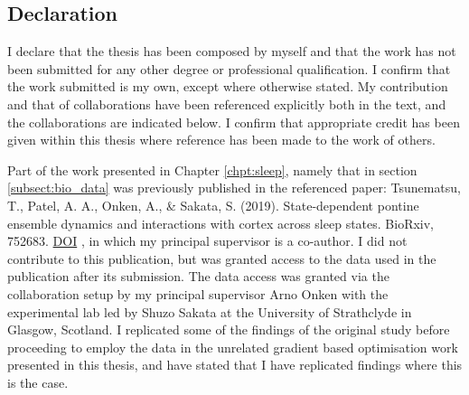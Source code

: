 \documentclass[mphil,deptreport,ianc]{infthesis} %
\begin{document}
\begin{preliminary}
\clearpage
\section*{Declaration}

I declare that the thesis has been composed by myself and that the work has not been submitted for any other degree or professional qualification. I confirm that the work submitted is my own, except where otherwise stated.
My contribution and that of collaborations have been referenced explicitly both in the text, and the collaborations are indicated below. I confirm that appropriate credit has been given within this thesis where reference has been made to the work of others.

Part of the work presented in Chapter \ref{chpt:sleep}, namely that in section \ref{subsect:bio_data} was previously published in the referenced paper: Tsunematsu, T., Patel, A. A., Onken, A., \& Sakata, S. (2019). State-dependent pontine ensemble dynamics and interactions with cortex across sleep states. BioRxiv, 752683. \href{https://doi.org/10.1101/752683}{DOI} \cite{Tsunematsu2019}, 
in which my principal supervisor is a co-author.
I did not contribute to this publication, but was granted access to the data used in the publication after its submission.
The data access was granted via the collaboration setup by my principal supervisor Arno Onken with the experimental lab led by Shuzo Sakata at the University of Strathclyde in Glasgow, Scotland.
I replicated some of the findings of the original study before proceeding to employ the data in the unrelated gradient based optimisation work presented in this thesis, and have stated that I have replicated findings where this is the case. 



\tableofcontents

\clearpage

\end{preliminary}
\end{document}
